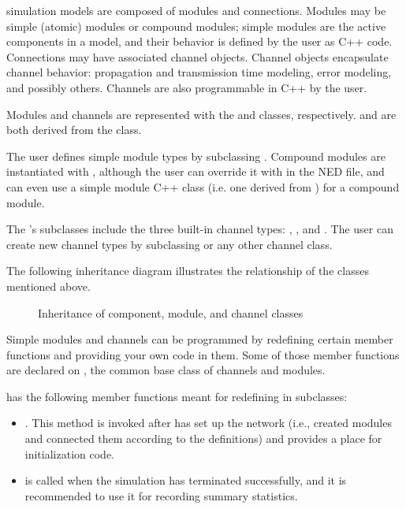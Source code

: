 {\opp} simulation models are composed of modules and connections. Modules
may be simple (atomic) modules or compound modules; simple modules are the
active components in a model, and their behavior is defined by the user as
C++ code. Connections may have associated channel objects. Channel objects
encapsulate channel behavior: propagation and transmission time modeling,
error modeling, and possibly others. Channels are also programmable in C++
by the user.

Modules and channels are represented with the  and 
classes, respectively.  and  are both
derived from the  class.

The user defines simple module types by subclassing .
Compound modules are instantiated with , although
the user can override it with  in the NED file, and can even
use a simple module C++ class (i.e. one derived from )
for a compound module.

The 's subclasses include the three built-in channel
types: , , and
. The user can create new channel types
by subclassing  or any other channel class.

The following inheritance diagram illustrates the relationship
of the classes mentioned above.

\begin{figure}[htbp]
  \begin{center}
    
    \caption{Inheritance of component, module, and channel classes}
  \end{center}
\end{figure}

Simple modules and channels can be programmed by redefining certain
member functions and providing your own code in them. Some of those
member functions are declared on , the common base
class of channels and modules.

 has the following member functions meant for
redefining in subclasses:

\begin{itemize}
  \item {}. This method is invoked after {\opp} has
    set up the network (i.e., created modules and connected them according
    to the definitions) and provides a place for initialization code.
  \item {} is called when the simulation has terminated
    successfully, and it is recommended to use it for recording summary
    statistics.
\end{itemize}

